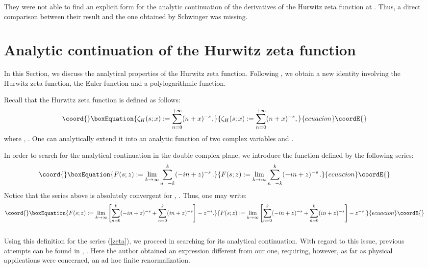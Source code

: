 \documentclass [11pt]{article}
\begin{document}
They were not able to find an explicit form for the analytic continuation of 
the derivatives of the Hurwitz zeta function at \coordHE{}.  Thus, a 
direct comparison between their result and the one  obtained by Schwinger 
was missing.



\section{Analytic continuation of the Hurwitz zeta function}


In this Section, we discuss the analytical properties of the Hurwitz zeta 
function.
Following \cite{8}, we obtain a new identity involving 
the Hurwitz zeta function, the Euler \coordHE{} function and a polylogarithmic function. 

Recall that the  Hurwitz zeta function is  defined as follows:
\begin{equation}\coord{}\boxEquation{
\label{Hurwitz}
\zeta_H(s;x):=\sum _{n=0}^{+\infty }(n+x)^{-s},
}{
\zeta_H(s;x):=\sum _{n=0}^{+\infty }(n+x)^{-s},
}{ecuacion}\coordE{}\end{equation}
where \coordHE{}, \coordHE{}.
One can analytically extend it into an analytic function of two complex 
variables  \coordHE{} and \coordHE{}.

In order to search for the analytical continuation in the double complex plane, we introduce the function \coordHE{}
defined by the following series:
\begin{equation}\coord{}\boxEquation{
\label{zeta}
F(s;z):=\lim_{k\rightarrow\infty}\sum_{n=-k}^{k}(-in+z)^{-s}\, .
}{
F(s;z):=\lim_{k\rightarrow\infty}\sum_{n=-k}^{k}(-in+z)^{-s}\, .
}{ecuacion}\coordE{}\end{equation}
Notice that the  series above is absolutely convergent  for  \coordHE{},
\coordHE{}. 
Thus, one may write:
\begin{equation}\coord{}\boxEquation{
\label{decomp}
F(s;z):=\lim_{k\rightarrow\infty}\left[ \sum_{n=0}^{k}(-in+z)^{-s}+\sum_{n=0}^{k}(in+z)^{-s}\right]-z^{-s}.
}{
F(s;z):=\lim_{k\rightarrow\infty}\left[ \sum_{n=0}^{k}(-in+z)^{-s}+\sum_{n=0}^{k}(in+z)^{-s}\right]-z^{-s}.
}{ecuacion}\coordE{}\end{equation}
\\
Using this definition for the series (\ref{zeta}), we proceed in searching for its analytical continuation.
With regard to this issue, previous attempts  can be found in \cite{Tomszeta}, \cite{Toms:1995rr}. Here the author obtained an expression different from our one, requiring, however, as far as   
physical  applications were concerned, an ad hoc finite renormalization.
\end{document}
